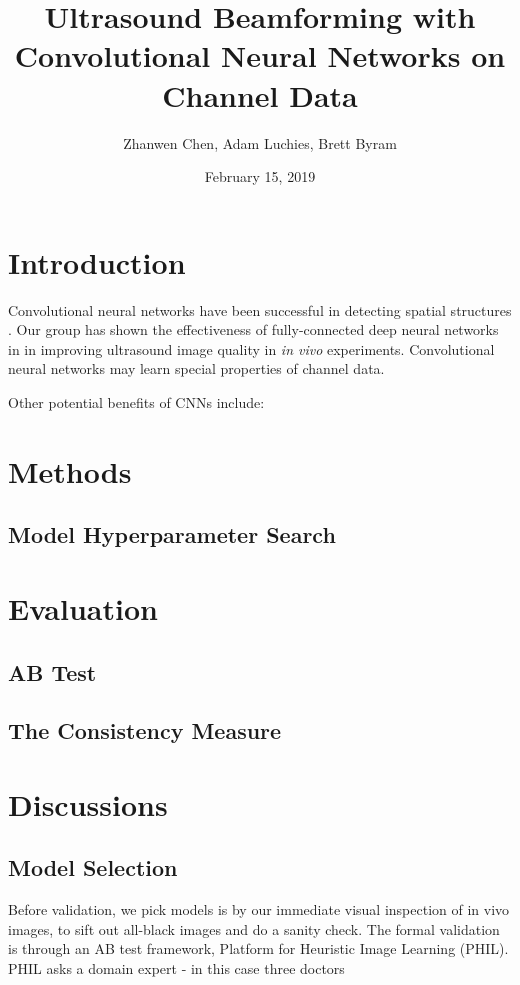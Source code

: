 \documentclass{article}
\title{Ultrasound Beamforming with Convolutional Neural Networks on Channel Data}
\author{Zhanwen Chen, Adam Luchies, Brett Byram}
\affil{Vanderbilt University}
\date{February 15, 2019}
\begin{document}
\maketitle

\section{Introduction}

Convolutional neural networks have been successful in detecting spatial
structures \cite{??}. Our group has shown the effectiveness of fully-connected
deep neural networks in \cite{???} in improving ultrasound image quality in
\textit{in vivo} experiments. Convolutional neural networks may learn special
properties of channel data.

Other potential benefits of CNNs include:


\section{Methods}

\subsection{Model Hyperparameter Search}

\section{Evaluation}
\subsection{AB Test}


\subsection{The Consistency Measure}

\section{Discussions}

\subsection{Model Selection}

Before validation, we pick models is by our immediate visual inspection of
in vivo images, to sift out all-black images and do a sanity check. The formal
validation is through an A\/B test framework, Platform for Heuristic Image Learning (PHIL). PHIL asks a domain expert - in this case three doctors
\end{document}

